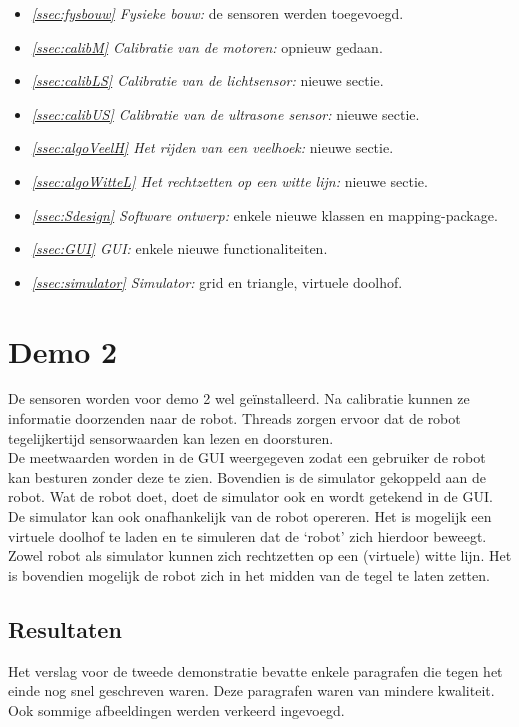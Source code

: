 \documentclass[eind]{penoverslag}
\begin{document}
\begin{itemize}
\item \textit{\ref{ssec:fysbouw} Fysieke bouw:} de sensoren werden toegevoegd.
\item \textit{\ref{ssec:calibM} Calibratie van de motoren:} opnieuw gedaan.
\item \textit{\ref{ssec:calibLS} Calibratie van de lichtsensor:} nieuwe sectie.
\item \textit{\ref{ssec:calibUS} Calibratie van de ultrasone sensor:} nieuwe sectie.
\item \textit{\ref{ssec:algoVeelH} Het rijden van een veelhoek:} nieuwe sectie.
\item \textit{\ref{ssec:algoWitteL} Het rechtzetten op een witte lijn:} nieuwe sectie.
\item \textit{\ref{ssec:Sdesign} Software ontwerp:} enkele nieuwe klassen en mapping-package.
\item \textit{\ref{ssec:GUI} GUI:} enkele nieuwe functionaliteiten.
\item \textit{\ref{ssec:simulator} Simulator:} grid en triangle, virtuele doolhof.
\end{itemize}


\section{Demo 2} %
\label{Asec:demo2}
De sensoren worden voor demo 2 wel ge\"installeerd. Na calibratie kunnen ze informatie doorzenden naar de robot. Threads zorgen ervoor dat de robot tegelijkertijd sensorwaarden kan lezen en doorsturen.\\

De meetwaarden worden in de GUI weergegeven zodat een gebruiker de robot kan besturen zonder deze te zien. Bovendien is de simulator gekoppeld aan de robot. Wat de robot doet, doet de simulator ook en wordt getekend in de GUI. De simulator kan ook onafhankelijk van de robot opereren. Het is mogelijk een virtuele doolhof te laden en te simuleren dat de `robot' zich hierdoor beweegt. Zowel robot als simulator kunnen zich rechtzetten op een (virtuele) witte lijn. Het is bovendien mogelijk de robot zich in het midden van de tegel te laten zetten.


\subsection{Resultaten} %
\label{Assec:result2}
Het verslag voor de tweede demonstratie bevatte enkele paragrafen die tegen het einde nog snel geschreven waren. Deze paragrafen waren van mindere kwaliteit. Ook sommige afbeeldingen werden verkeerd ingevoegd.\\
\end{document}
